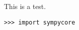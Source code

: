 \documentclass{article}
\begin{document}
This is a test.
\begin{verbatim}
>>> import sympycore
\end{verbatim}
\end{document}
